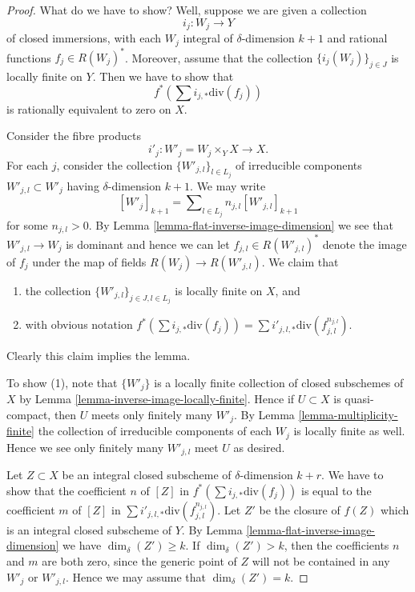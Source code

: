 \begin{proof}
What do we have to show? Well, suppose we are given a collection
$$
i_j : W_j \longrightarrow Y
$$
of closed immersions, with each $W_j$ integral of $\delta$-dimension $k + 1$
and rational functions $f_j \in R(W_j)^*$.
Moreover, assume that
the collection $\{i_j(W_j)\}_{j \in J}$ is locally finite on $Y$.
Then we have to show that
$$
f^*(\sum i_{j, *}\text{div}(f_j))
$$
is rationally equivalent to zero on $X$.

\medskip\noindent
Consider the fibre products
$$
i'_j : 
W'_j = W_j \times_Y X
\longrightarrow
X.
$$
For each $j$, consider the collection $\{W'_{j, l}\}_{l \in L_j}$
of irreducible components $W'_{j, l} \subset W'_j$ having $\delta$-dimension
$k + 1$. We may write
$$
[W'_j]_{k + 1} = \sum\nolimits_{l \in L_j} n_{j, l}[W'_{j, l}]_{k + 1}
$$
for some $n_{j, l} > 0$.
By Lemma \ref{lemma-flat-inverse-image-dimension}
we see that $W'_{j, l} \to W_j$ is
dominant and hence we can let $f_{j, l} \in R(W'_{j, l})^*$ denote the
image of $f_j$ under the map of fields $R(W_j) \to R(W'_{j, l})$.
We claim that
\begin{enumerate}
\item the collection $\{W'_{j, l}\}_{j \in J, l \in L_j}$ is
locally finite on $X$, and
\item with obvious notation
$f^*(\sum i_{j, *}\text{div}(f_j))
=
\sum i'_{j, l, *} \text{div}(f_{j, l}^{n_{j, l}})$.
\end{enumerate}
Clearly this claim implies the lemma.

\medskip\noindent
To show (1), note that $\{W'_j\}$ is a locally finite collection
of closed subschemes of $X$ by Lemma \ref{lemma-inverse-image-locally-finite}.
Hence if $U \subset X$ is quasi-compact, then $U$ meets only finitely
many $W'_j$. By Lemma \ref{lemma-multiplicity-finite} the collection of
irreducible components of each $W_j$ is locally finite as well. Hence
we see only finitely many $W'_{j, l}$ meet $U$ as desired.

\medskip\noindent
Let $Z \subset X$ be an integral closed subscheme of $\delta$-dimension
$k + r$. We have to show that the coefficient $n$ of $[Z]$ in
$f^*(\sum i_{j, *}\text{div}(f_j))$ is equal to the coefficient
$m$ of $[Z]$ in $\sum i'_{j, l, *} \text{div}(f_{j, l}^{n_{j, l}})$.
Let $Z'$ be the closure of $f(Z)$ which is an integral closed
subscheme of $Y$. By Lemma \ref{lemma-flat-inverse-image-dimension}
we have $\dim_\delta(Z') \geq k$.
If $\dim_\delta(Z') > k$, then the coefficients $n$ and $m$ are
both zero, since the generic point of $Z$ will not be contained
in any $W'_j$ or $W'_{j, l}$. Hence we may assume that $\dim_\delta(Z') = k$.


\end{proof}
